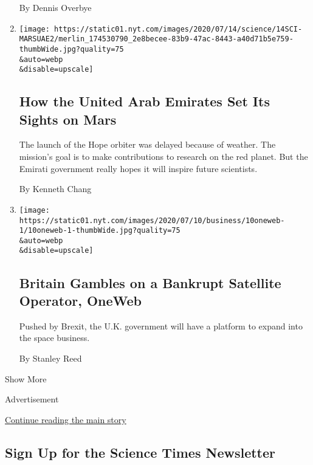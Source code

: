 \begin{enumerate}
  By Dennis Overbye
\item
  \href{/2020/07/14/science/mars-united-arab-emirates.html}{}

  \texttt{[image: https://static01.nyt.com/images/2020/07/14/science/14SCI-MARSUAE2/merlin\_174530790\_2e8becee-83b9-47ac-8443-a40d71b5e759-thumbWide.jpg?quality=75\\\&auto=webp\\\&disable=upscale]}

  \hypertarget{how-the-united-arab-emirates-set-its-sights-on-mars}{%
  \subsection{How the United Arab Emirates Set Its Sights on
  Mars}\label{how-the-united-arab-emirates-set-its-sights-on-mars}}

  The launch of the Hope orbiter was delayed because of weather. The
  mission's goal is to make contributions to research on the red planet.
  But the Emirati government really hopes it will inspire future
  scientists.

  By Kenneth Chang
\item
  \href{/2020/07/10/business/britain-oneweb.html}{}

  \texttt{[image: https://static01.nyt.com/images/2020/07/10/business/10oneweb-1/10oneweb-1-thumbWide.jpg?quality=75\\\&auto=webp\\\&disable=upscale]}

  \hypertarget{britain-gambles-on-a-bankrupt-satellite-operator-oneweb}{%
  \subsection{Britain Gambles on a Bankrupt Satellite Operator,
  OneWeb}\label{britain-gambles-on-a-bankrupt-satellite-operator-oneweb}}

  Pushed by Brexit, the U.K. government will have a platform to expand
  into the space business.

  By Stanley Reed
\end{enumerate}

Show More

Advertisement

\protect\hyperlink{after-mid3}{Continue reading the main story}

\hypertarget{sign-up-for-the-science-times-newsletter}{%
\subsection{Sign Up for the Science Times
Newsletter}\label{sign-up-for-the-science-times-newsletter}}


